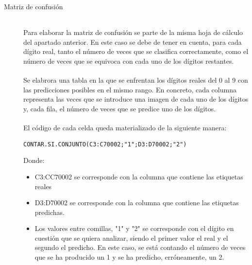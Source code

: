\begin{description}
\begin{itemize}
{	}
	\end{itemize}
	\vspace{5pt}
	\item[Matriz de confusión] \hfill 
	\vspace{5pt}
	\\
	Para elaborar la matriz de confusión se parte de la misma hoja de cálculo del apartado anterior. En este caso se debe de tener en cuenta, para cada dígito real, tanto el número de veces que se clasifica correctamente, como el número de veces que se equivoca con cada uno de los dígitos restantes.\\
	\vspace{-10pt}
	\\
	Se elabrora una tabla en la que se enfrentan los dígitos reales del 0 al 9 con las predicciones posibles en el mismo rango. En concreto, cada columna representa las veces que se introduce una imagen de cada uno de los dígitos y, cada fila, el número de veces que se predice uno de los dígitos.\\
	\vspace{-10pt}
	\\
	El código de cada celda queda materializado de la siguiente manera:
	\vspace{10pt}
	\begin{lstlisting}[frame=single]
	CONTAR.SI.CONJUNTO(C3:C70002;"1";D3:D70002;"2")
	\end{lstlisting}
	Donde:
	\begin{itemize}
		\item C3:CC70002 se corresponde con la columna que contiene las etiquetas reales
		\item D3:D70002 se corresponde con la columna que contiene las etiquetas predichas.
		\item Los valores entre comillas, "1" y "2" se corresponde con el dígito en cuestión que se quiera analizar, siendo el primer valor el real y el segundo el predicho. En este caso, se está contando el número de veces que se ha producido un 1 y se ha predicho, erróneamente, un 2.
	\end{itemize}
	

\end{description}
